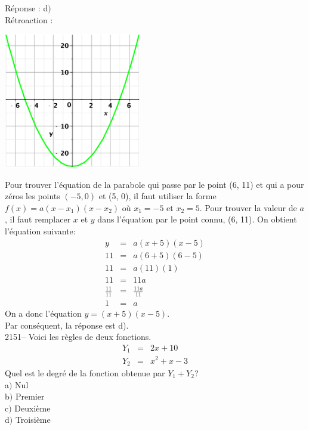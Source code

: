 \documentclass[letterpaper, 12pt]{article}
\begin{document}
R\'eponse : d$)$\\

R\'etroaction :\\
\begin{center}
 \includegraphics[width=6cm,bb=20 118 575 673]{Q2150.eps}
\end{center}
Pour trouver l'\'equation de la parabole qui passe par le point (6, 11) et qui a pour z\'eros les points \mbox{$(-5, 0)$} et (5, 0), il faut utiliser la forme $f(x)=a(x-x_{1})(x-x_{2})$ o\`u  $x_{1}=-5$ et $x_{2}=5$. Pour trouver la valeur de $a$, il faut remplacer $x$ et $y$ dans l'\'equation par le point connu, (6, 11). On obtient l'\'equation suivante:
\begin{eqnarray*}
y&=&a(x+5)(x-5)\\
 11&=&a(6+5)(6-5)\\
 11&=&a(11)(1)\\
 11&=&11a\\[2mm]
\frac{11}{11}&=&\frac{11a}{11}\\[2mm]
1&=&a
\end{eqnarray*}
On a donc l'\'equation $y= (x+5)(x-5)$.\\
Par cons\'equent, la r\'eponse est d).\\

2151-- Voici les r\`egles de deux fonctions.
\begin{eqnarray*}
 Y_{1}&=&2x+10\\
 Y_{2}&=&x^{2}+x-3
\end{eqnarray*}
Quel est le degr\'e de la fonction obtenue par $Y_{1}+Y_{2}$?\\

a$)$ Nul\\
b$)$ Premier\\
c$)$ Deuxi\`eme\\
d$)$ Troisi\`eme\\
\end{document}
